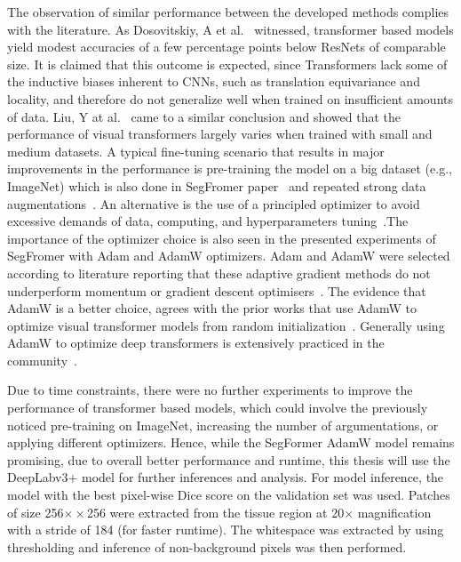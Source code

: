 The observation of similar performance between the developed methods complies with the literature. 
As Dosovitskiy, A et al.~\cite*{dosovitskiy2020image} witnessed, transformer based models yield
modest accuracies of a few percentage points below ResNets of comparable size. It is claimed
that this outcome is expected, since Transformers lack some of the inductive biases
inherent to CNNs, such as translation equivariance and locality, and therefore do not generalize
well when trained on insufficient amounts of data. Liu, Y at al.~\cite{liu2021efficient} came to
a similar conclusion and showed that the performance of visual transformers largely varies when
trained with small and medium datasets. A typical fine-tuning scenario that results in major
improvements in the performance is pre-training the model on a big dataset (e.g., ImageNet) which
is also done in SegFromer paper~\cite*{xie2021segformer} and repeated strong data augmentations~\cite{touvron2021training}.
An alternative is the use of a principled optimizer to avoid excessive demands of data,
computing, and hyperparameters tuning~\cite*{chen2021vision}.The importance of the optimizer
choice is also seen in the presented experiments of SegFromer with Adam and AdamW optimizers.
Adam and AdamW were selected according to literature reporting that these adaptive gradient
methods do not underperform momentum or gradient descent optimisers~\cite{choi2019empirical}.
The evidence that AdamW is a better choice, agrees with the prior works that use AdamW to
optimize visual transformer models from random initialization~\cite{xiao2021early}. Generally using AdamW
to optimize deep transformers is extensively practiced in the community~\cite{anonymous2023applying}.

Due to time constraints, there were no further experiments to improve the performance of transformer
based models, which could involve the previously noticed pre-training on ImageNet, increasing
the number of argumentations, or applying different optimizers.
Hence, while the SegFormer AdamW model remains promising, due to overall better performance and
runtime, this thesis will use the DeepLabv3+ model for further inferences and analysis.
For model inference, the model with the best pixel-wise Dice score on the validation set was used.
Patches of size 256$×\times$256 were extracted from the tissue region at 20$\times$ magnification
with a stride of 184 (for faster runtime). The whitespace was extracted by using thresholding and
inference of non-background pixels was then performed.

